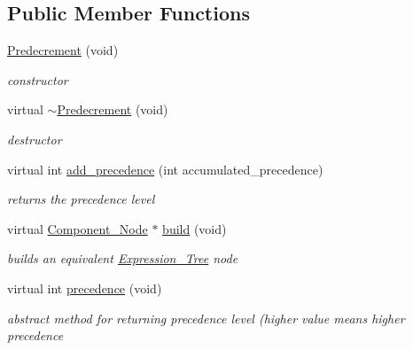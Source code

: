 \subsection*{Public Member Functions}
\begin{DoxyCompactItemize}
\item 
\hyperlink{classMadara_1_1Expression__Tree_1_1Predecrement_aa8c3bde1626ef30b6c16c35c0a0ff934}{Predecrement} (void)
\begin{DoxyCompactList}\small\item\em constructor \item\end{DoxyCompactList}\item 
virtual \hyperlink{classMadara_1_1Expression__Tree_1_1Predecrement_ab2cd2c6ea004b541c4dd83af20dd0949}{$\sim$Predecrement} (void)
\begin{DoxyCompactList}\small\item\em destructor \item\end{DoxyCompactList}\item 
virtual int \hyperlink{classMadara_1_1Expression__Tree_1_1Predecrement_a683daa4587f4a0a0842486928fdaeb81}{add\_\-precedence} (int accumulated\_\-precedence)
\begin{DoxyCompactList}\small\item\em returns the precedence level \item\end{DoxyCompactList}\item 
virtual \hyperlink{classMadara_1_1Expression__Tree_1_1Component__Node}{Component\_\-Node} $\ast$ \hyperlink{classMadara_1_1Expression__Tree_1_1Predecrement_a23c3bb7e8ce577f19ff60a4c7537e847}{build} (void)
\begin{DoxyCompactList}\small\item\em builds an equivalent \hyperlink{classMadara_1_1Expression__Tree_1_1Expression__Tree}{Expression\_\-Tree} node \item\end{DoxyCompactList}\item 
virtual int \hyperlink{classMadara_1_1Expression__Tree_1_1Symbol_ac060dedb8d16864591b259df375109b3}{precedence} (void)
\begin{DoxyCompactList}\small\item\em abstract method for returning precedence level (higher value means higher precedence \item\end{DoxyCompactList}\end{DoxyCompactItemize}
